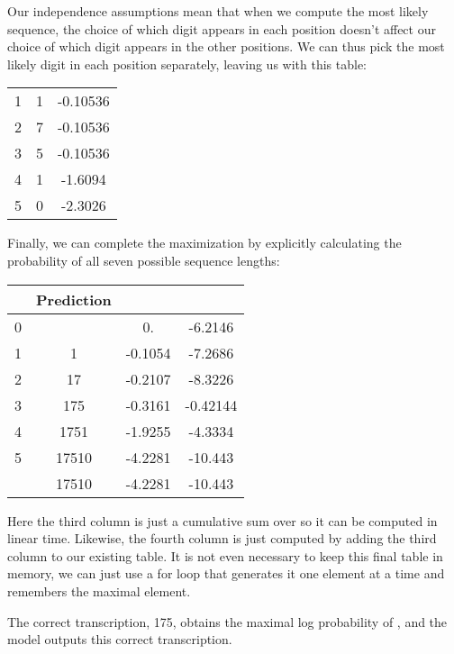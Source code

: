 \documentclass{article} \usepackage{comment}
\begin{document}
Our independence assumptions mean that when we compute the most likely sequence, the choice of which digit appears in each position
doesn't affect our choice of which digit appears in the other positions. We can thus pick the most likely digit in each position
separately, leaving us with this table:

\begin{tabular}{c|c|c}
 &  &  \\ 
\hline
1 & 1 & -0.10536 \\
\hline
2 & 7 & -0.10536 \\
\hline
3 & 5 & -0.10536 \\
\hline
4 & 1 & -1.6094 \\
\hline
5 & 0 & -2.3026
\end{tabular}

Finally, we can complete the maximization by explicitly calculating the probability of all seven possible sequence lengths:

\begin{tabular}{c|c|c|c}
 & Prediction &  &  \\
\hline
0 &              & 0.      & -6.2146 \\
\hline
1 & 1            & -0.1054 & -7.2686 \\
\hline
2 & 17           & -0.2107 & -8.3226 \\
\hline
3 & 175          & -0.3161 & -0.42144 \\
\hline
4 & 1751         & -1.9255 & -4.3334 \\
\hline
5 & 17510        & -4.2281 & -10.443 \\
\hline
&17510& -4.2281 & -10.443
\end{tabular}

Here the third column is just a cumulative sum over  so it can be computed in linear time.
Likewise, the fourth column is just computed by adding the third column to our existing  table.
It is not even necessary to keep this final table in memory, we can just use a for loop that generates it
one element at a time and remembers the maximal element.

The correct transcription, 175, obtains the maximal log probability of , and the model outputs
this correct transcription.
\end{document}

